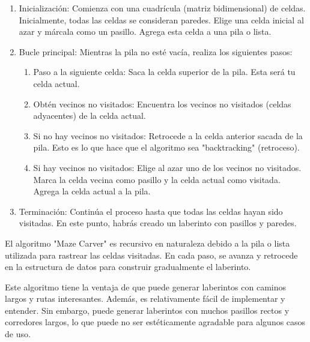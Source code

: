 \documentclass[a4paper,12pt]{article}
\begin{document}
\begin{enumerate}
	\item Inicialización:
    Comienza con una cuadrícula (matriz bidimensional) de celdas. Inicialmente, todas las celdas se consideran paredes. Elige una celda inicial al azar y márcala como un pasillo. Agrega esta celda a una pila o lista.

    \item Bucle principal:
    Mientras la pila no esté vacía, realiza los siguientes pasos:

    \begin{enumerate}[label=\alph*]
		\item Paso a la siguiente celda: Saca la celda superior de la pila. Esta será tu celda actual.

    	\item Obtén vecinos no visitados: Encuentra los vecinos no visitados (celdas adyacentes) de la celda actual.

    	\item Si no hay vecinos no visitados: Retrocede a la celda anterior sacada de la pila. Esto es lo que hace que el algoritmo sea "backtracking" (retroceso).

    	\item Si hay vecinos no visitados: Elige al azar uno de los vecinos no visitados. Marca la celda vecina como pasillo y la celda actual como visitada. Agrega la celda actual a la pila.
	 \end{enumerate}

    \item Terminación: Continúa el proceso hasta que todas las celdas hayan sido visitadas. En este punto, habrás creado un laberinto con pasillos y paredes.
\end{enumerate}

El algoritmo "Maze Carver" es recursivo en naturaleza debido a la pila o lista utilizada para rastrear las celdas visitadas. En cada paso, se avanza y retrocede en la estructura de datos para construir gradualmente el laberinto.

Este algoritmo tiene la ventaja de que puede generar laberintos con caminos largos y rutas interesantes. Además, es relativamente fácil de implementar y entender. Sin embargo, puede generar laberintos con muchos pasillos rectos y corredores largos, lo que puede no ser estéticamente agradable para algunos casos de uso.

\vspace{0.5cm}
\end{document}
